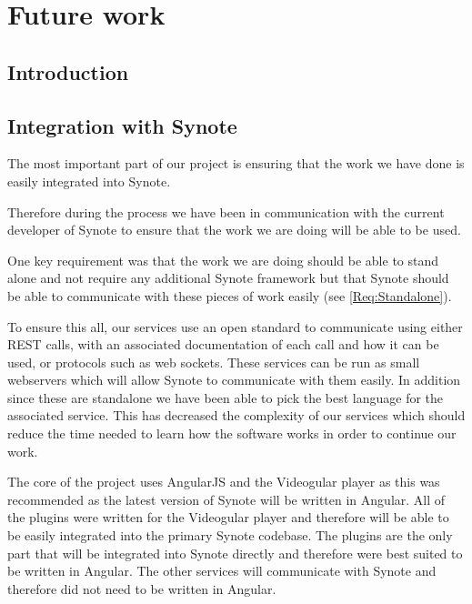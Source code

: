 \chapter{Future work} \label{Chapter: Future Work}


\section{Introduction}


\section{Integration with Synote}

The most important part of our project is ensuring that the work we have done is easily integrated into Synote.

Therefore during the process we have been in communication with the current developer of Synote to ensure that the work we are doing will be able to be used.

One key requirement was that the work we are doing should be able to stand alone and not require any additional Synote framework but that Synote should be able to communicate with these pieces of work easily (see \cref{Req:Standalone}).

To ensure this all, our services use an open standard to communicate using either \gls{REST} calls, with an associated documentation of each call and how it can be used, or protocols such as web sockets. These services can be run as small webservers which will allow Synote to communicate with them easily. In addition since these are standalone we have been able to pick the best language for the associated service. This has decreased the complexity of our services which should reduce the time needed to learn how the software works in order to continue our work.

The core of the project uses \gls{AngularJS} and the \gls{Videogular} player as this was recommended as the latest version of Synote will be written in Angular. All of the plugins were written for the \gls{Videogular} player and therefore will be able to be easily integrated into the primary Synote codebase. The plugins are the only part that will be integrated into Synote directly and therefore were best suited to be written in Angular. The other services will communicate with Synote and therefore did not need to be written in Angular.

